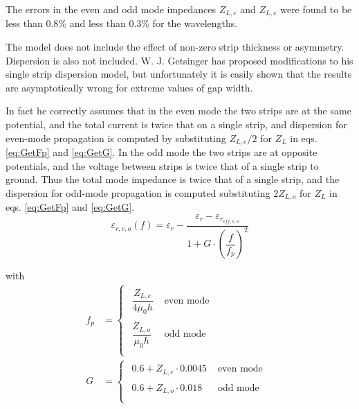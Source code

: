 \documentclass[10pt]{report}
\begin{document}
The errors in the even and odd mode impedances $Z_{L,e}$ and $Z_{L,e}$
were found to be less than 0.8\% and less than 0.3\% for the
wavelengths.

\addvspace{12pt}

The model does not include the effect of non-zero strip thickness or
asymmetry.  Dispersion is also not included.  W. J. Getsinger
\cite{Getsinger4} has proposed modifications to his single strip
dispersion model, but unfortunately it is easily shown that the
results are asymptotically wrong for extreme values of gap width.

\addvspace{12pt}

In fact he correctly assumes that in the even mode the two strips are
at the same potential, and the total current is twice that on a single
strip, and dispersion for even-mode propagation is computed by
substituting $Z_{L,e}/2$ for $Z_L$ in eqs. \eqref{eq:GetFp} and
\eqref{eq:GetG}.  In the odd mode the two strips are at opposite
potentials, and the voltage between strips is twice that of a single
strip to ground.  Thus the total mode impedance is twice that of a
single strip, and the dispersion for odd-mode propagation is computed
substituting $2Z_{L,o}$ for $Z_L$ in eqs. \eqref{eq:GetFp} and
\eqref{eq:GetG}.
\begin{equation}
\varepsilon_{r,e,o}\left(f\right) = \varepsilon_{r} - \frac{\varepsilon_{r} - \varepsilon_{r_{eff,e,o}}}{1 + G\cdot \left(\dfrac{f}{f_{p}}\right)^{2}}
\end{equation}

with
\begin{align}
f_{p} &=
\begin{cases}
\begin{array}{ll}
\dfrac{Z_{L,e}}{4\mu_{0} h} & \textrm{ even mode }\\&\\
\dfrac{Z_{L,o}}{\mu_{0} h}  & \textrm{ odd mode }\\
\end{array}
\end{cases}\\
G &=
\begin{cases}
\begin{array}{ll}
0.6 + Z_{L,e}\cdot 0.0045 & \textrm{ even mode }\\&\\
0.6 + Z_{L,o}\cdot 0.018 & \textrm{ odd mode }\\
\end{array}
\end{cases}
\end{align}
\end{document}
